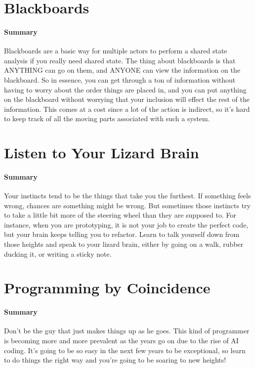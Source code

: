 \documentclass{article}
\begin{document}
\section{Blackboards}
        \paragraph{Summary} Blackboards are a basic way for multiple actors to perform a shared state analysis if you really need shared state. The thing about blackboards is that ANYTHING can go on them, and ANYONE can view the information on the blackboard. So in essence, you can get through a ton of information without having to worry about the order things are placed in, and you can put anything on the blackboard without worrying that your inclusion will effect the rest of the information. This comes at a cost since a lot of the action is indirect, so it's hard to keep track of all the moving parts associated with such a system.

\section{Listen to Your Lizard Brain}
    \paragraph{Summary} Your instincts tend to be the things that take you the furthest. If something feels wrong, chances are something might be wrong. But sometimes those instincts try to take a little bit more of the steering wheel than they are supposed to. For instance, when you are prototyping, it is not your job to create the perfect code, but your brain keeps telling you to refactor. Learn to talk yourself down from those heights and speak to your lizard brain, either by going on a walk, rubber ducking it, or writing a sticky note.

\section{Programming by Coincidence}
    \paragraph{Summary} Don't be the guy that just makes things up as he goes. This kind of programmer is becoming more and more prevalent as the years go on due to the rise of AI coding. It's going to be so easy in the next few years to be exceptional, so learn to do things the right way and you're going to be soaring to new heights!
\end{document}
